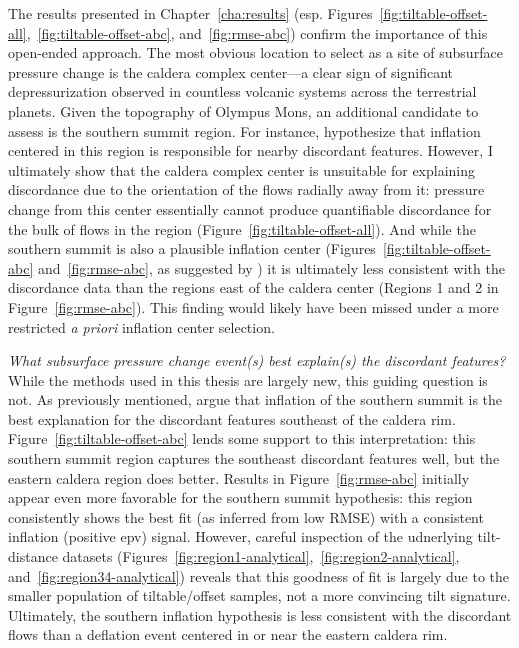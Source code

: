 The results presented in Chapter~\ref{cha:results} (esp. Figures~\ref{fig:tiltable-offset-all},~\ref{fig:tiltable-offset-abc}, and~\ref{fig:rmse-abc}) confirm the importance of this open-ended approach. The most obvious location to select as a site of subsurface pressure change is the caldera complex center---a clear sign of significant depressurization observed in countless volcanic systems across the terrestrial planets. Given the topography of Olympus Mons, an additional candidate to assess is the southern summit region. For instance, \textcite{mouginis-mark_late-stage_2019} hypothesize that inflation centered in this region is responsible for nearby discordant features. However, I ultimately show that the caldera complex center is unsuitable for explaining discordance due to the orientation of the flows radially away from it: pressure change from this center essentially cannot produce quantifiable discordance for the bulk of flows in the region (Figure~\ref{fig:tiltable-offset-all}). And while the southern summit is also a plausible inflation center (Figures~\ref{fig:tiltable-offset-abc} and~\ref{fig:rmse-abc}, as suggested by \parencite{mouginis-mark_late-stage_2019}) it is ultimately less consistent with the discordance data than the regions east of the caldera center (Regions 1 and 2 in Figure~\ref{fig:rmse-abc}). This finding would likely have been missed under a more restricted \emph{a priori} inflation center selection. 

\emph{What subsurface pressure change event(s) best explain(s) the discordant features?} While the methods used in this thesis are largely new, this guiding question is not. As previously mentioned, \parencite{mouginis-mark_late-stage_2019} argue that inflation of the southern summit is the best explanation for the discordant features southeast of the caldera rim. Figure~\ref{fig:tiltable-offset-abc} lends some support to this interpretation: this southern summit region captures the southeast discordant features well, but the eastern caldera region does better. Results in Figure~\ref{fig:rmse-abc} initially appear even more favorable for the southern summit hypothesis: this region consistently shows the best fit (as inferred from low \acs{RMSE}) with a consistent inflation (positive \acs{epv}) signal. However, careful inspection of the udnerlying tilt-distance datasets (Figures~\ref{fig:region1-analytical},~\ref{fig:region2-analytical}, and~\ref{fig:region34-analytical}) reveals that this goodness of fit is largely due to the smaller population of tiltable/offset samples, not a more convincing tilt signature. Ultimately, the southern inflation hypothesis is less consistent with the discordant flows than a deflation event centered in or near the eastern caldera rim.

